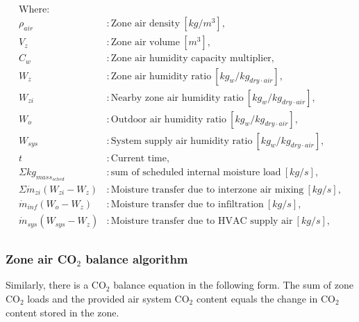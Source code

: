 \begin{align*}
\text{Where: }\\
  \rho_{air} &: \text{Zone air density} ~ [kg/m^{3}], \\
  V_{z} &: \text{Zone air volume} ~ [m^{3}],\\
  C_{w} &: \text{Zone air humidity capacity multiplier},\\
  W_{z} &: \text{Zone air humidity ratio} ~ [kg_w/kg_{dry\cdot air}],\\
  W_{zi} &: \text{Nearby zone air humidity ratio} ~ [kg_w/kg_{dry\cdot air}],\\
  W_{o} &: \text{Outdoor air humidity ratio} ~ [kg_w/kg_{dry\cdot air}],\\
  W_{sys} &: \text{System supply air humidity ratio} ~ [kg_w/kg_{dry\cdot air}],\\
  t &: \text{Current time},\\
  \Sigma{kg_{mass_{sched}}} &: \text{sum of scheduled internal moisture load} ~ [kg/s],\\
  \Sigma{\dot{m}_{zi}(W_{zi}-W_z)} &: \text{Moisture transfer due to interzone air mixing} ~ [kg/s],\\
  \dot{m}_{inf} (W_o - W_z) &: \text{Moisture transfer due to infiltration} ~ [kg/s],\\
  \dot{m}_{sys} (W_{sys} - W_z) &: \text{Moisture transfer due to HVAC supply air} ~ [kg/s],\\
\end{align*}

\subsubsection{Zone air CO$_2$ balance algorithm}\label{Zone-air-CO$_2$-balance-algorithm}
Similarly, there is a CO$_2$ balance equation in the following form. The sum of zone CO$_2$ loads and the provided air system CO$_2$ content equals the change in CO$_2$ content stored in the zone.

